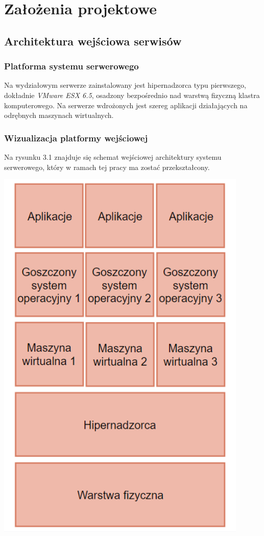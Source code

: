 \documentclass[polish, a4paper, 12pt, oneside]{book}
\begin{document}
	\chapter{Założenia projektowe}
	\section{Architektura wejściowa serwisów}
	\subsection{Platforma systemu serwerowego}
	Na wydziałowym serwerze zainstalowany jest hipernadzorca typu pierwszego, dokładnie \textit{VMware ESX 6.5}\cite{vmwareesx}, osadzony bezpośrednio nad warstwą fizyczną klastra komputerowego. Na serwerze wdrożonych jest szereg aplikacji działających na odrębnych maszynach wirtualnych.
	
	\subsection {Wizualizacja platformy wejściowej} Na rysunku 3.1 znajduje się schemat wejściowej architektury systemu serwerowego, który w ramach tej pracy ma zostać przekształcony.
	\begin{center}
		\includegraphics[width=120mm]{schemat_archwej.png}
	\end{center}
	
\end{document}
